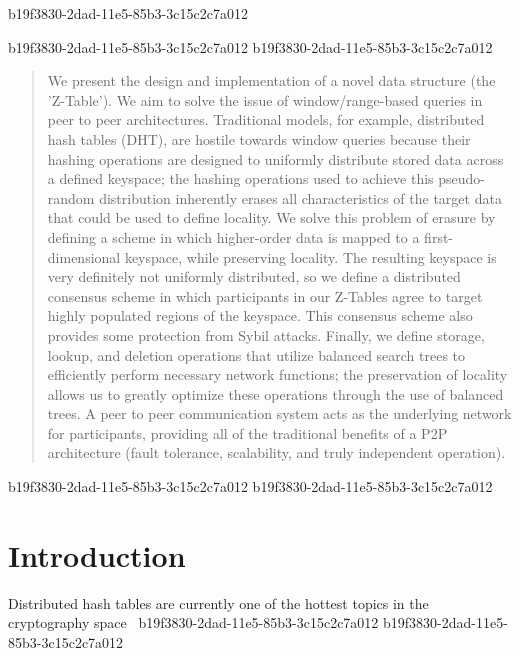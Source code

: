 \documentclass[12pt]{article}
\begin{document}
b19f3830-2dad-11e5-85b3-3c15c2c7a012\maketitle
b19f3830-2dad-11e5-85b3-3c15c2c7a012
b19f3830-2dad-11e5-85b3-3c15c2c7a012\begin{abstract}
We present the design and implementation of a novel data structure (the 'Z-Table'). We aim to solve the issue of window/range-based queries in peer to peer architectures. Traditional models, for example,  distributed hash tables (DHT), are hostile towards window queries because their hashing operations are designed to uniformly distribute stored data across a defined keyspace; the hashing operations used to achieve this pseudo-random distribution inherently erases all characteristics of the target data that could be used to define locality. We solve this problem of erasure by defining a scheme in which higher-order data is mapped to a first-dimensional keyspace, while preserving locality. The resulting keyspace is very definitely not uniformly distributed, so we define a distributed consensus scheme in which participants in our Z-Tables agree to target highly populated regions of the keyspace. This consensus scheme also provides some protection from Sybil attacks. Finally, we define storage, lookup, and deletion operations that utilize balanced search trees to efficiently perform necessary network functions; the preservation of locality allows us to greatly optimize these operations through the use of balanced trees. A peer to peer communication system acts as the underlying network for participants, providing all of the traditional benefits of a P2P architecture (fault tolerance, scalability, and truly independent operation).
\end{abstract}

b19f3830-2dad-11e5-85b3-3c15c2c7a012
\newpage
b19f3830-2dad-11e5-85b3-3c15c2c7a012\section{Introduction}
Distributed hash tables are currently one of the hottest topics in the cryptography space~\cite{Stoica:2001dj,Rowstron:2001ea,Ratnasamy:2001wn}
b19f3830-2dad-11e5-85b3-3c15c2c7a012
b19f3830-2dad-11e5-85b3-3c15c2c7a012\printbibliography
\end{document}
